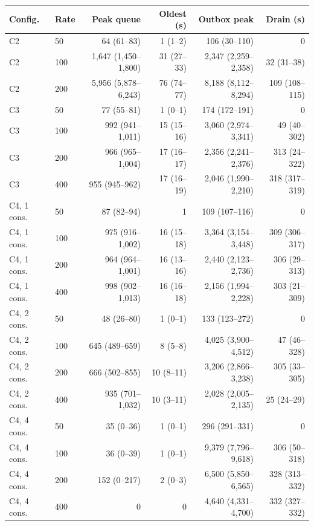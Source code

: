 \begin{tabular}{llrrrr}
\toprule
Config. & Rate & Peak queue & Oldest (s) & Outbox peak & Drain (s) \\
\midrule
C2 & 50 & 64 (61--83) & 1 (1--2) & 106 (30--110) & 0 \\
C2 & 100 & 1,647 (1,450--1,800) & 31 (27--33) & 2,347 (2,259--2,358) & 32 (31--38) \\
C2 & 200 & 5,956 (5,878--6,243) & 76 (74--77) & 8,188 (8,112--8,294) & 109 (108--115) \\
\addlinespace[2pt]
C3 & 50 & 77 (55--81) & 1 (0--1) & 174 (172--191) & 0 \\
C3 & 100 & 992 (941--1,011) & 15 (15--16) & 3,060 (2,974--3,341) & 49 (40--302) \\
C3 & 200 & 966 (965--1,004) & 17 (16--17) & 2,356 (2,241--2,376) & 313 (24--322) \\
C3 & 400 & 955 (945--962) & 17 (16--19) & 2,046 (1,990--2,210) & 318 (317--319) \\
\addlinespace[2pt]
C4, 1 cons. & 50 & 87 (82--94) & 1 & 109 (107--116) & 0 \\
C4, 1 cons. & 100 & 975 (916--1,002) & 16 (15--18) & 3,364 (3,154--3,448) & 309 (306--317) \\
C4, 1 cons. & 200 & 964 (964--1,001) & 16 (13--16) & 2,440 (2,123--2,736) & 306 (29--313) \\
C4, 1 cons. & 400 & 998 (902--1,013) & 16 (16--18) & 2,156 (1,994--2,228) & 303 (21--309) \\
\addlinespace[2pt]
C4, 2 cons. & 50 & 48 (26--80) & 1 (0--1) & 133 (123--272) & 0 \\
C4, 2 cons. & 100 & 645 (489--659) & 8 (5--8) & 4,025 (3,900--4,512) & 47 (46--328) \\
C4, 2 cons. & 200 & 666 (502--855) & 10 (8--11) & 3,206 (2,866--3,238) & 305 (33--305) \\
C4, 2 cons. & 400 & 935 (701--1,032) & 10 (3--11) & 2,028 (2,005--2,135) & 25 (24--29) \\
\addlinespace[2pt]
C4, 4 cons. & 50 & 35 (0--36) & 1 (0--1) & 296 (291--331) & 0 \\
C4, 4 cons. & 100 & 36 (0--39) & 1 (0--1) & 9,379 (7,796--9,618) & 306 (50--318) \\
C4, 4 cons. & 200 & 152 (0--217) & 2 (0--3) & 6,500 (5,850--6,565) & 328 (313--332) \\
C4, 4 cons. & 400 & 0 & 0 & 4,640 (4,331--4,700) & 332 (327--332) \\
\bottomrule
\end{tabular}

